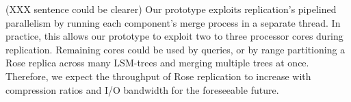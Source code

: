 \documentclass{vldb}
\newcommand{\rows}{Rose\xspace}
\newcommand{\rowss}{Rose's\xspace}
\begin{document}
(XXX sentence could be clearer) Our prototype exploits replication's pipelined parallelism by running
each component's merge process in a separate thread.  In practice,
this allows our prototype to exploit two to three processor cores
during replication.  Remaining cores could be used by queries, or
by range partitioning a \rows replica across many LSM-trees
and merging multiple trees at once.
Therefore, we expect the throughput of \rows replication to increase
with compression ratios and I/O bandwidth for the foreseeable future.





\end{document}
